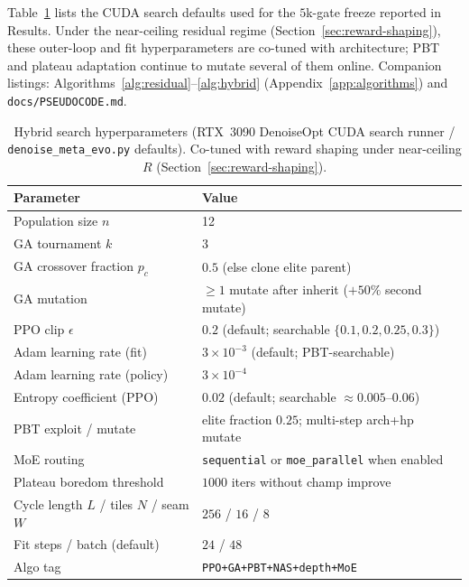 Table~\ref{tab:hyperparams} lists the CUDA search defaults used for the $5$k-gate freeze reported in Results.
Under the near-ceiling residual regime (Section~\ref{sec:reward-shaping}), these outer-loop and fit hyperparameters are co-tuned with architecture; PBT and plateau adaptation continue to mutate several of them online.
Companion listings: Algorithms~\ref{alg:residual}--\ref{alg:hybrid} (Appendix~\ref{app:algorithms}) and \texttt{docs/PSEUDOCODE.md}.

\begin{table}[t]
  \centering
  \small
  \caption{Hybrid search hyperparameters (RTX~3090 DenoiseOpt CUDA search runner / \texttt{denoise\_meta\_evo.py} defaults). Co-tuned with reward shaping under near-ceiling $R$ (Section~\ref{sec:reward-shaping}).}
  \label{tab:hyperparams}
  \setlength{\tabcolsep}{3pt}
  \begin{tabular}{@{}lp{}@{}}
    \toprule
    Parameter & Value \\
    \midrule
    Population size $n$ & 12 \\
    GA tournament $k$ & 3 \\
    GA crossover fraction $p_c$ & $0.5$ (else clone elite parent) \\
    GA mutation & $\ge 1$ mutate after inherit ($+50\%$ second mutate) \\
    PPO clip $\epsilon$ & $0.2$ (default; searchable $\{0.1,0.2,0.25,0.3\}$) \\
    Adam learning rate (fit) & $3{\times}10^{-3}$ (default; PBT-searchable) \\
    Adam learning rate (policy) & $3{\times}10^{-4}$ \\
    Entropy coefficient (PPO) & $0.02$ (default; searchable $\approx 0.005$--$0.06$) \\
    PBT exploit / mutate & elite fraction $0.25$; multi-step arch+hp mutate \\
    MoE routing & \texttt{sequential} or \texttt{moe\_parallel} when enabled \\
    Plateau boredom threshold & $1000$ iters without champ improve \\
    Cycle length $L$ / tiles $N$ / seam $W$ & $256$ / $16$ / $8$ \\
    Fit steps / batch (default) & $24$ / $48$ \\
    Algo tag & \texttt{PPO+GA+PBT+NAS+depth+MoE} \\
    \bottomrule
  \end{tabular}
\end{table}
